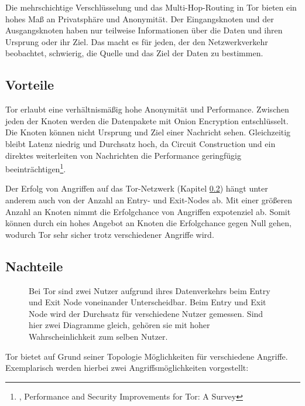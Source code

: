 Die mehrschichtige Verschlüsselung und das Multi-Hop-Routing in Tor bieten ein hohes Maß an Privatsphäre und Anonymität. Der Eingangsknoten und der Ausgangsknoten haben nur teilweise Informationen über die Daten und ihren Ursprung oder ihr Ziel. Das macht es für jeden, der den Netzwerkverkehr beobachtet, schwierig, die Quelle und das Ziel der Daten zu bestimmen\footnotemark{}.

\subsection{Vorteile}
\label{chap:tor_advantages}

Tor erlaubt eine verhältnismäßig hohe Anonymität und Performance. Zwischen jeden der Knoten werden die Datenpakete mit Onion Encryption entschlüsselt. Die Knoten können nicht Ursprung und Ziel einer Nachricht sehen. Gleichzeitig bleibt Latenz niedrig und Durchsatz hoch, da Circuit Construction und ein direktes weiterleiten von Nachrichten die Performance geringfügig beeinträchtigen\footnote{\cite{PerformanceAndSecurityTor}, Performance and Security Improvements for Tor: A Survey}.

Der Erfolg von Angriffen auf das Tor-Netzwerk (Kapitel \ref{chap:tor_disatvantages}) hängt unter anderem auch von der Anzahl an Entry- und Exit-Nodes ab. Mit einer größeren Anzahl an Knoten nimmt die Erfolgchance von Angriffen expotenziel ab. Somit können durch ein hohes Angebot an Knoten die Erfolgchance gegen Null gehen, wodurch Tor sehr sicher trotz verschiedener Angriffe wird.

\subsection{Nachteile}
\label{chap:tor_disatvantages}

\begin{figure}[h!]
    \centering
    
    \caption{Bei Tor sind zwei Nutzer aufgrund ihres Datenverkehrs beim Entry und Exit Node voneinander Unterscheidbar. Beim Entry und Exit Node wird der Durchsatz für verschiedene Nutzer gemessen. Sind hier zwei Diagramme gleich, gehören sie mit hoher Wahrscheinlichkeit zum selben Nutzer.}
    \label{imgs:tor_transfer}
\end{figure}

Tor bietet auf Grund seiner Topologie Möglichkeiten für verschiedene Angriffe. Exemplarisch werden hierbei zwei Angriffsmöglichkeiten vorgestellt:

